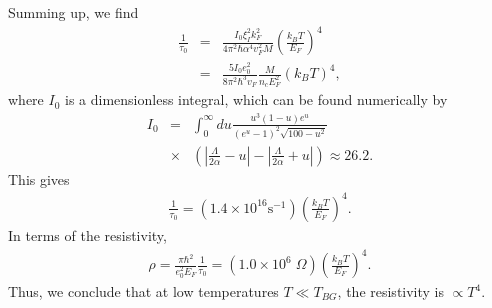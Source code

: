 Summing up, we find
%
\begin{eqnarray}
\frac{1}{\tau_0}&=&\frac{I_0\xi_I^2k_F^2}{4\pi^2\hbar \alpha^4v_F^2M}\left(\frac{k_BT}{E_F}\right)^4\nonumber\\
&=&\frac{5I_0e_0^2}{8\pi^2\hbar^3 v_F}\frac{M}{n_cE_F^2}(k_BT)^4,
\end{eqnarray}
%
where $I_0$ is a dimensionless integral, which can be found numerically by
%
\begin{eqnarray}
I_0&=&\int_0^\infty du\frac{u^3(1-u)e^u}{(e^u-1)^2\sqrt{100-u^2}}\nonumber\\
&\times&\left(\left|\frac{\Lambda}{2\alpha}-u\right|-\left|\frac{\Lambda}{2\alpha}+u\right|\right)
\approx 26.2.
\end{eqnarray}
%
This gives
\begin{eqnarray}
\frac{1}{\tau_0}=(1.4\times 10^{16}\mbox{s}^{-1})\left(\frac{k_BT}{E_F}\right)^4.
\end{eqnarray}
%
In terms of the resistivity,
%
\begin{eqnarray}
\label{AP6_Arho3}
\rho=\frac{\pi\hbar^2}{e_0^2E_F}\frac{1}{\tau_0}=(1.0\times 10^6\;\Omega)\left(\frac{k_BT}{E_F}\right)^4.
\end{eqnarray}
%
Thus, we conclude that at low temperatures $T\ll T_{BG}$, the resistivity is $\propto T^4$.


